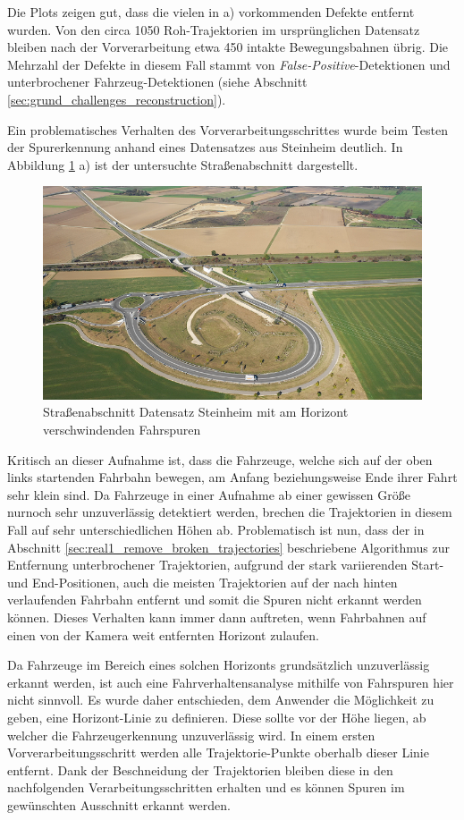 Die Plots zeigen gut, dass die vielen in a) vorkommenden Defekte entfernt wurden. Von den
circa 1050 Roh-Trajektorien im ursprünglichen Datensatz bleiben nach der Vorverarbeitung etwa 450 intakte
Bewegungsbahnen übrig. Die Mehrzahl der Defekte in diesem Fall stammt von \textit{False-Positive}-Detektionen
und unterbrochener Fahrzeug-Detektionen (siehe Abschnitt \ref{sec:grund_challenges_reconstruction}).

Ein problematisches Verhalten des Vorverarbeitungsschrittes wurde beim Testen der Spurerkennung anhand eines
Datensatzes aus Steinheim deutlich. In Abbildung \ref{fig:results_horizon_problem} a) ist der
untersuchte Straßenabschnitt dargestellt.

\begin{figure}[H]
    \centering
    \includegraphics[width=0.4\linewidth]{resources/img/results/Steinheim/steinheim}
    \caption[Straßenabschnitt Datensatz Steinheim]
            {Straßenabschnitt Datensatz Steinheim mit am Horizont verschwindenden Fahrspuren}
    \label{fig:results_horizon_problem}
\end{figure}

Kritisch an dieser Aufnahme ist, dass die Fahrzeuge, welche sich auf der oben links startenden Fahrbahn bewegen,
am Anfang beziehungsweise Ende ihrer Fahrt sehr klein sind. Da Fahrzeuge in einer Aufnahme ab einer gewissen Größe
nurnoch sehr unzuverlässig detektiert werden, brechen die Trajektorien in diesem Fall auf sehr
unterschiedlichen Höhen ab. %
Problematisch ist nun, dass der in Abschnitt \ref{sec:real1_remove_broken_trajectories} beschriebene Algorithmus
zur Entfernung unterbrochener Trajektorien, aufgrund der stark variierenden Start- und End-Positionen,
auch die meisten Trajektorien auf der nach hinten verlaufenden Fahrbahn entfernt und somit die Spuren
nicht erkannt werden können. Dieses Verhalten kann immer dann auftreten, wenn Fahrbahnen auf einen
von der Kamera weit entfernten Horizont zulaufen.

Da Fahrzeuge im Bereich eines solchen Horizonts grundsätzlich unzuverlässig erkannt werden, ist auch eine Fahrverhaltensanalyse
mithilfe von Fahrspuren hier nicht sinnvoll. Es wurde daher entschieden, dem Anwender die Möglichkeit zu geben, eine
Horizont-Linie zu definieren. Diese sollte vor der Höhe liegen, ab welcher die Fahrzeugerkennung unzuverlässig wird.
In einem ersten Vorverarbeitungsschritt werden alle Trajektorie-Punkte oberhalb dieser
Linie entfernt. Dank der Beschneidung der Trajektorien bleiben diese in den nachfolgenden Verarbeitungsschritten
erhalten und es können Spuren im gewünschten Ausschnitt erkannt werden.

